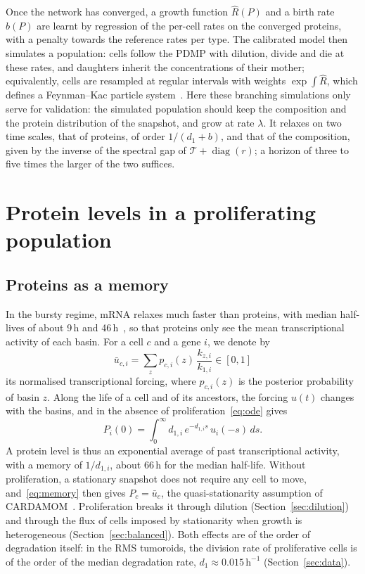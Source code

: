 \documentclass[a4paper, 11pt]{article}
\DeclareMathOperator{\diag}{diag}
\newcommand{\Tg}{\mathcal{T}}
\theoremstyle{plain}
\theoremstyle{remark}
\begin{document}
Once the network has converged, a growth function $\hat R(P)$ and a birth rate $\hat b(P)$ are learnt by regression of the per-cell rates on the converged proteins, with a penalty towards the reference rates per type. The calibrated model then simulates a population: cells follow the PDMP with dilution, divide and die at these rates, and daughters inherit the concentrations of their mother; equivalently, cells are resampled at regular intervals with weights $\exp\int \hat R$, which defines a Feynman--Kac particle system~\cite{delmoral2004feynman}. Here these branching simulations only serve for validation: the simulated population should keep the composition and the protein distribution of the snapshot, and grow at rate $\lambda$. It relaxes on two time scales, that of proteins, of order $1/(d_1 + b)$, and that of the composition, given by the inverse of the spectral gap of $\Tg + \diag(r)$; a horizon of three to five times the larger of the two suffices.

\section{Protein levels in a proliferating population}\label{sec:theory}

\subsection{Proteins as a memory}

In the bursty regime, mRNA relaxes much faster than proteins, with median half-lives of about 9\,h and 46\,h~\cite{schwanhausser2011global}, so that proteins only see the mean transcriptional activity of each basin. For a cell $c$ and a gene $i$, we denote by
\begin{equation}\label{eq:forcing}
\bar u_{c,i} = \sum_z p_{c,i}(z)\,\frac{k_{z,i}}{k_{1,i}} \in [0,1]
\end{equation}
its normalised transcriptional forcing, where $p_{c,i}(z)$ is the posterior probability of basin $z$. Along the life of a cell and of its ancestors, the forcing $u(t)$ changes with the basins, and in the absence of proliferation~\eqref{eq:ode} gives
\begin{equation}\label{eq:memory}
P_i(0) = \int_0^{\infty} d_{1,i}\, e^{-d_{1,i}s}\, u_i(-s)\,ds .
\end{equation}
A protein level is thus an exponential average of past transcriptional activity, with a memory of $1/d_{1,i}$, about 66\,h for the median half-life. Without proliferation, a stationary snapshot does not require any cell to move, and~\eqref{eq:memory} then gives $P_c = \bar u_c$, the quasi-stationarity assumption of CARDAMOM~\cite{ventre2023one}. Proliferation breaks it through dilution (Section~\ref{sec:dilution}) and through the flux of cells imposed by stationarity when growth is heterogeneous (Section~\ref{sec:balanced}). Both effects are of the order of degradation itself: in the RMS tumoroids, the division rate of proliferative cells is of the order of the median degradation rate, $d_1 \approx 0.015\,\mathrm{h}^{-1}$ (Section~\ref{sec:data}).
\end{document}
